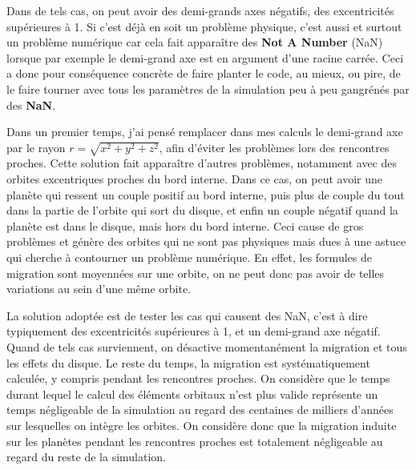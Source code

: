 Dans de tels cas, on peut avoir des demi-grands axes négatifs, des excentricités supérieures à 1. Si c'est déjà en soit un 
problème physique, c'est aussi et surtout un problème numérique car cela fait apparaître des \textbf{Not A Number} (NaN) lorsque 
par exemple le demi-grand axe est en argument d'une racine carrée. Ceci a donc pour conséquence concrète de faire planter le 
code, au mieux, ou pire, de le faire tourner avec tous les paramètres de la simulation peu à peu gangrénés par des 
\textbf{NaN}. 

Dans un premier temps, j'ai pensé remplacer dans mes calculs le demi-grand axe par le rayon $r=\sqrt{x^2+y^2+z^2}$, afin 
d'éviter les problèmes lors des rencontres proches. Cette solution fait apparaître d'autres problèmes, notamment avec des 
orbites excentriques proches du bord interne. Dans ce cas, on peut avoir une planète qui ressent un couple positif au bord 
interne, puis plus de couple du tout dans la partie de l'orbite qui sort du disque, et enfin un couple négatif quand la planète 
est dans le disque, mais hors du bord interne. Ceci cause de gros problèmes et génère des orbites qui ne sont pas physiques 
mais dues à une astuce qui cherche à contourner un problème numérique. En effet, les formules de migration sont moyennées sur 
une orbite, on ne peut donc pas avoir de telles variations au sein d'une même orbite.

La solution adoptée est de tester les cas qui causent des NaN, c'est à dire typiquement des excentricités supérieures à 1, et 
un demi-grand axe négatif. Quand de tels cas surviennent, on désactive momentanément la migration et tous les effets du 
disque. Le reste du temps, la migration est systématiquement calculée, y compris pendant les rencontres proches. On considère 
que le temps durant lequel le calcul des éléments orbitaux n'est plus valide représente un temps négligeable de la 
simulation au regard des centaines de milliers d'années sur lesquelles on intègre les orbites. On considère donc que la 
migration induite sur les planètes pendant les rencontres proches est totalement négligeable au regard du reste de la 
simulation.

